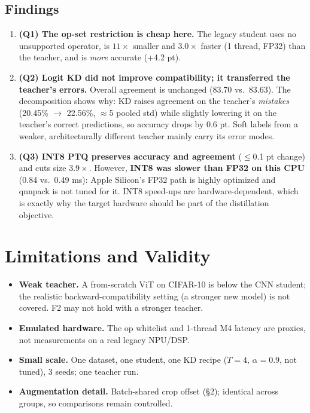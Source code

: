 \documentclass[11pt]{article}
\begin{document}
\subsection{Findings}
\begin{enumerate}[label=F\arabic*.]
  \item \textbf{(Q1) The op-set restriction is cheap here.} The legacy student uses no unsupported operator,
        is $11\times$ smaller and $3.0\times$ faster (1 thread, FP32) than the teacher, and is \emph{more} accurate (+4.2 pt).
  \item \textbf{(Q2) Logit KD did not improve compatibility; it transferred the teacher's errors.}
        Overall agreement is unchanged (83.70 vs.\ 83.63). The decomposition shows why: KD raises agreement on the
        teacher's \emph{mistakes} (20.45\% $\rightarrow$ 22.56\%, $\approx$5 pooled std) while slightly lowering it on the teacher's
        correct predictions, so accuracy drops by 0.6 pt. Soft labels from a weaker, architecturally different teacher
        mainly carry its error modes.
  \item \textbf{(Q3) INT8 PTQ preserves accuracy and agreement} ($\le$0.1 pt change) and cuts size $3.9\times$.
        However, \textbf{INT8 was slower than FP32 on this CPU} (0.84 vs.\ 0.49 ms): Apple Silicon's FP32 path is highly
        optimized and qnnpack is not tuned for it. INT8 speed-ups are hardware-dependent, which is exactly why the target
        hardware should be part of the distillation objective.
\end{enumerate}

\section{Limitations and Validity}
\begin{itemize}
  \item \textbf{Weak teacher.} A from-scratch ViT on CIFAR-10 is below the CNN student; the realistic
        backward-compatibility setting (a stronger new model) is not covered. F2 may not hold with a stronger teacher.
  \item \textbf{Emulated hardware.} The op whitelist and 1-thread M4 latency are proxies, not measurements on a real legacy NPU/DSP.
  \item \textbf{Small scale.} One dataset, one student, one KD recipe ($T=4$, $\alpha=0.9$, not tuned), 3 seeds; one teacher run.
  \item \textbf{Augmentation detail.} Batch-shared crop offset (\S2); identical across groups, so comparisons remain controlled.
\end{itemize}
\end{document}
